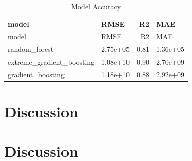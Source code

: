 \documentclass[11pt,]{article}
\begin{document}
\begin{longtable}[]{@{}llrl@{}}
\caption{Model Accuracy}\tabularnewline
\toprule
model & RMSE & R2 & MAE\tabularnewline
\midrule
\endfirsthead
\toprule
model & RMSE & R2 & MAE\tabularnewline
\midrule
\endhead
random\_forest & 2.75e+05 & 0.81 & 1.36e+05\tabularnewline
extreme\_gradient\_boosting & 1.08e+10 & 0.90 & 2.70e+09\tabularnewline
gradient\_boosting & 1.18e+10 & 0.88 & 2.92e+09\tabularnewline
\bottomrule
\end{longtable}

\hypertarget{discussion}{%
\section{Discussion}\label{discussion}}

\hypertarget{discussion-1}{%
\section{Discussion}\label{discussion-1}}





\newpage
\singlespacing 
\end{document}
